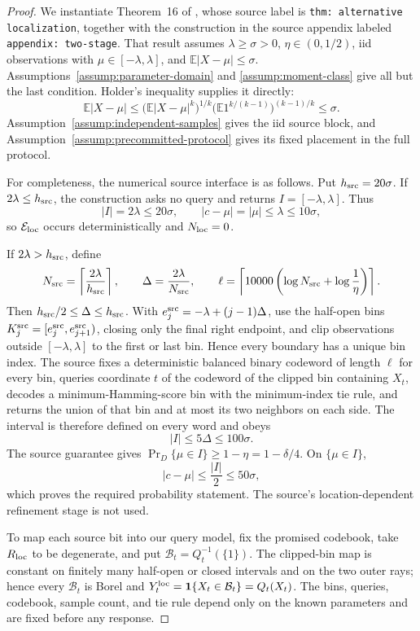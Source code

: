 \begin{proof}
We instantiate Theorem~16 of \citet{lau-scarlett-2026}, whose source label is
\texttt{thm: alternative localization}, together with the construction in
the source appendix labeled \texttt{appendix: two-stage}.  That result assumes
$\lambda\geq\sigma>0$, $\eta\in(0,1/2)$, iid observations with
$\mu\in[-\lambda,\lambda]$, and $\mathbb E|X-\mu|\leq\sigma$.
Assumptions~\ref{assump:parameter-domain} and \ref{assump:moment-class}
give all but the last condition.  Holder's inequality supplies it directly:
\[
 \mathbb E|X-\mu|
 \leq\bigl(\mathbb E|X-\mu|^k\bigr)^{1/k}
       \bigl(\mathbb E1^{k/(k-1)}\bigr)^{(k-1)/k}
 \leq\sigma.
\]
Assumption~\ref{assump:independent-samples} gives the iid source block, and
Assumption~\ref{assump:precommitted-protocol} gives its fixed placement in
the full protocol.

For completeness, the numerical source interface is as follows.  Put
$h_{\rm src}=20\sigma$.  If $2\lambda\leq h_{\rm src}$, the construction
asks no query and returns $I=[-\lambda,\lambda]$.  Thus
\[
 |I|=2\lambda\leq20\sigma,\qquad
 |c-\mu|=|\mu|\leq\lambda\leq10\sigma,
\]
so $\mathcal E_{\rm loc}$ occurs deterministically and $N_{\rm loc}=0$.

If $2\lambda>h_{\rm src}$, define
\[
 N_{\rm src}=\left\lceil\frac{2\lambda}{h_{\rm src}}\right\rceil,
 \qquad
 \Delta=\frac{2\lambda}{N_{\rm src}},
 \qquad
 \ell=\left\lceil10000\left(
    \log N_{\rm src}+\log\frac1\eta\right)\right\rceil.
\]
Then $h_{\rm src}/2\leq\Delta\leq h_{\rm src}$.  With
$e_j^{\rm src}=-\lambda+(j-1)\Delta$, use the half-open bins
$K_j^{\rm src}=[e_j^{\rm src},e_{j+1}^{\rm src})$, closing only the final
right endpoint, and clip observations outside $[-\lambda,\lambda]$ to the
first or last bin.  Hence every boundary has a unique bin index.  The source
fixes a deterministic balanced binary codeword of length $\ell$ for every
bin, queries coordinate $t$ of the codeword of the clipped bin containing
$X_t$, decodes a minimum-Hamming-score bin with the minimum-index tie rule,
and returns the union of that bin and at most its two neighbors on each side.
The interval is therefore defined on every word and obeys
\[
 |I|\leq5\Delta\leq100\sigma.
\]
The source guarantee gives
$\Pr_D\{\mu\in I\}\geq1-\eta=1-\delta/4$.  On $\{\mu\in I\}$,
\[
 |c-\mu|\leq\frac{|I|}{2}\leq50\sigma,
\]
which proves the required probability statement.  The source's
location-dependent refinement stage is not used.

To map each source bit into our query model, fix the promised codebook, take
$R_{\rm loc}$ to be degenerate, and put
$\mathcal B_t=Q_t^{-1}(\{1\})$.  The clipped-bin map is constant on finitely
many half-open or closed intervals and on the two outer rays; hence every
$\mathcal B_t$ is Borel and
$Y_t^{\rm loc}=\mathbf1\{X_t\in\mathcal B_t\}=Q_t(X_t)$.  The bins,
queries, codebook, sample count, and tie rule depend only on the known
parameters and are fixed before any response.


\end{proof}
